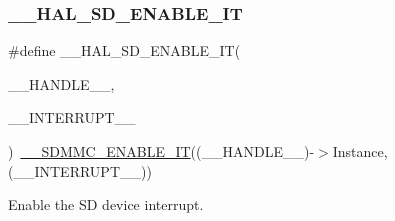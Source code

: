 \subsubsection{\texorpdfstring{\_\_HAL\_SD\_ENABLE\_IT}{\_\_HAL\_SD\_ENABLE\_IT}}
{\footnotesize\ttfamily \#define \+\_\+\+\_\+\+H\+A\+L\+\_\+\+S\+D\+\_\+\+E\+N\+A\+B\+L\+E\+\_\+\+IT(\begin{DoxyParamCaption}\item[{}]{\+\_\+\+\_\+\+H\+A\+N\+D\+L\+E\+\_\+\+\_\+,  }\item[{}]{\+\_\+\+\_\+\+I\+N\+T\+E\+R\+R\+U\+P\+T\+\_\+\+\_\+ }\end{DoxyParamCaption})~\mbox{\hyperlink{group___s_d_m_m_c___l_l___interrupt___clock_ga086886ffa7d502709c637568ed6e0466}{\+\_\+\+\_\+\+S\+D\+M\+M\+C\+\_\+\+E\+N\+A\+B\+L\+E\+\_\+\+IT}}((\+\_\+\+\_\+\+H\+A\+N\+D\+L\+E\+\_\+\+\_\+)-\/$>$Instance, (\+\_\+\+\_\+\+I\+N\+T\+E\+R\+R\+U\+P\+T\+\_\+\+\_\+))}



Enable the SD device interrupt. 



